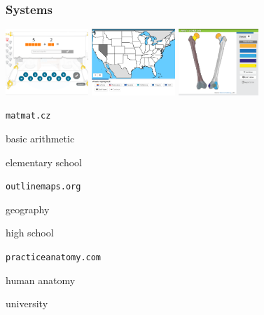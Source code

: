 \documentclass[xcolor=svgnames]{beamer}
\begin{document}
\begin{frame}
    \frametitle{Systems}
    \small
    \includegraphics[height=2.5cm]{figures/matmat.png}
    \hfill
    \includegraphics[height=2.5cm]{figures/slepemapy.png}
    \hfill
    \includegraphics[height=2.5cm]{figures/anatom.png}

    \centering
    \begin{multicols}{3}
       \texttt{matmat.cz}

       \vspace{5mm}
       basic arithmetic

       \vspace{5mm}
       elementary school

    \columnbreak
       \texttt{outlinemaps.org}

       \vspace{5mm}
       geography

       \vspace{5mm}
       high school

    \columnbreak
       \texttt{practiceanatomy.com}

       \vspace{5mm}
       human anatomy

       \vspace{5mm}
       university
    \end{multicols}
\end{frame}
\end{document}
